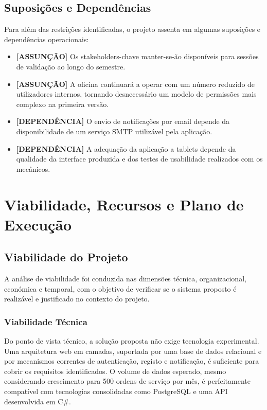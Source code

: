 \documentclass[a4paper,12pt]{scrreprt}
\begin{document}
    \section{Suposições e Dependências}
        Para além das restrições identificadas, o projeto assenta em algumas suposições e dependências operacionais:

        \begin{itemize}
            \item \textbf{[ASSUNÇÃO]} Os stakeholders-chave manter-se-ão disponíveis para sessões de validação ao longo do semestre.
            \item \textbf{[ASSUNÇÃO]} A oficina continuará a operar com um número reduzido de utilizadores internos, tornando desnecessário um modelo de permissões mais complexo na primeira versão.
            \item \textbf{[DEPENDÊNCIA]} O envio de notificações por email depende da disponibilidade de um serviço SMTP utilizável pela aplicação.
            \item \textbf{[DEPENDÊNCIA]} A adequação da aplicação a tablets depende da qualidade da interface produzida e dos testes de usabilidade realizados com os mecânicos.
        \end{itemize}

\chapter{Viabilidade, Recursos e Plano de Execução}

    \section{Viabilidade do Projeto}
        A análise de viabilidade foi conduzida nas dimensões técnica, organizacional, económica e temporal, com o objetivo de verificar se o sistema proposto é realizável e justificado no contexto do projeto.

        \subsection{Viabilidade Técnica}
        Do ponto de vista técnico, a solução proposta não exige tecnologia experimental. Uma arquitetura web em camadas, suportada por uma base de dados relacional e por mecanismos correntes de autenticação, registo e notificação, é suficiente para cobrir os requisitos identificados. O volume de dados esperado, mesmo considerando crescimento para 500 ordens de serviço por mês, é perfeitamente compatível com tecnologias consolidadas como PostgreSQL e uma API desenvolvida em C\#.
\end{document}
